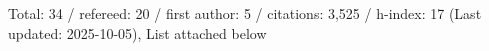 Total: 34 / refereed: 20 / first author: 5 / citations: 3,525 / h-index: 17 (Last updated: 2025-10-05), List attached below
